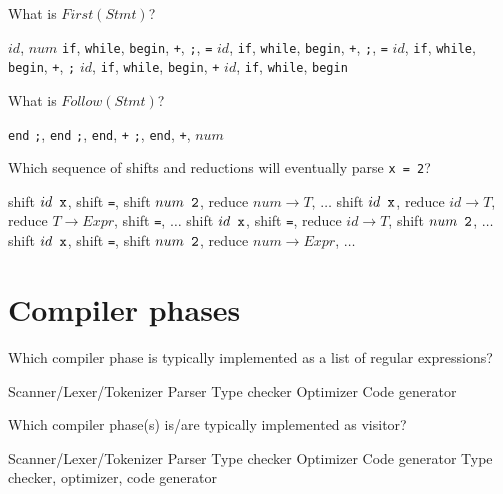 \documentclass[addpoints]{exam}
\begin{document}
\begin{questions}
\question What is $First(Stmt)$?

\begin{choices}
\choice $id$, $num$ \verb+if+, \verb+while+, \verb+begin+, \verb|+|, \verb+;+, \verb+=+
\choice $id$, \verb+if+, \verb+while+, \verb+begin+, \verb|+|, \verb+;+, \verb+=+
\choice $id$, \verb+if+, \verb+while+, \verb+begin+, \verb|+|, \verb+;+
\choice $id$, \verb+if+, \verb+while+, \verb+begin+, \verb|+|
\choice $id$, \verb+if+, \verb+while+, \verb+begin+
\end{choices}

\answerline

\question What is $Follow(Stmt)$?

\begin{choices}
\choice \verb+end+
\choice \verb+;+, \verb+end+
\choice \verb+;+, \verb+end+, \verb|+|
\choice \verb+;+, \verb+end+, \verb|+|, $num$
\end{choices}

\answerline

\question Which sequence of shifts and reductions will eventually parse \verb+x = 2+?

\begin{choices}
\choice shift $id \verb+ x+$, shift \verb+=+, shift $num \verb+ 2+$, reduce $num \to T$, $\ldots$
\choice shift $id \verb+ x+$, reduce $id \to T$, reduce $T \to Expr$, shift \verb+=+, $\ldots$
\choice shift $id \verb+ x+$, shift \verb+=+, reduce $id \to T$, shift $num \verb+ 2+$, $\ldots$
\choice shift $id \verb+ x+$, shift \verb+=+, shift $num \verb+ 2+$, reduce $num \to Expr$, $\ldots$
\end{choices}

\answerline
\pagebreak

\section{Compiler phases}

\question Which compiler phase is typically implemented as a list of regular expressions?

\begin{oneparchoices}
\choice Scanner/Lexer/Tokenizer
\choice Parser
\choice Type checker
\choice Optimizer
\choice Code generator
\end{oneparchoices}

\answerline

\question Which compiler phase(s) is/are typically implemented as visitor?

\begin{choices}
\choice Scanner/Lexer/Tokenizer
\choice Parser
\choice Type checker
\choice Optimizer
\choice Code generator
\choice Type checker, optimizer, code generator
\end{choices}


\end{questions}
\end{document}
